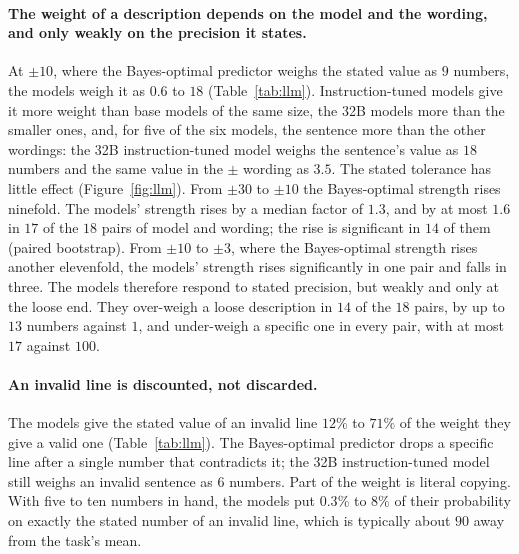 \documentclass[10pt]{article}
\begin{document}
\paragraph{The weight of a description depends on the model and the wording, and only weakly on the precision it states.} At $\pm 10$, where the Bayes-optimal predictor weighs the stated value as $9$ numbers, the models weigh it as $0.6$ to $18$ (Table~\ref{tab:llm}). Instruction-tuned models give it more weight than base models of the same size, the 32B models more than the smaller ones, and, for five of the six models, the sentence more than the other wordings: the 32B instruction-tuned model weighs the sentence's value as $18$ numbers and the same value in the $\pm$ wording as $3.5$. The stated tolerance has little effect (Figure~\ref{fig:llm}). From $\pm 30$ to $\pm 10$ the Bayes-optimal strength rises ninefold. The models' strength rises by a median factor of $1.3$, and by at most $1.6$ in $17$ of the $18$ pairs of model and wording; the rise is significant in $14$ of them (paired bootstrap). From $\pm 10$ to $\pm 3$, where the Bayes-optimal strength rises another elevenfold, the models' strength rises significantly in one pair and falls in three. The models therefore respond to stated precision, but weakly and only at the loose end. They over-weigh a loose description in $14$ of the $18$ pairs, by up to $13$ numbers against $1$, and under-weigh a specific one in every pair, with at most $17$ against $100$.

\paragraph{An invalid line is discounted, not discarded.} The models give the stated value of an invalid line $12\%$ to $71\%$ of the weight they give a valid one (Table~\ref{tab:llm}). The Bayes-optimal predictor drops a specific line after a single number that contradicts it; the 32B instruction-tuned model still weighs an invalid sentence as $6$ numbers. Part of the weight is literal copying. With five to ten numbers in hand, the models put $0.3\%$ to $8\%$ of their probability on exactly the stated number of an invalid line, which is typically about $90$ away from the task's mean.
\end{document}
